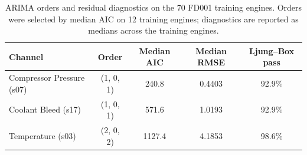 \begin{table}[H]
\centering
\caption{ARIMA orders and residual diagnostics on the 70 FD001 training engines.
Orders were selected by median AIC on 12 training engines; diagnostics are reported as
medians across the training engines.}
\label{tab:arima}
\small
\begin{tabular}{lcccc}
\toprule
Channel & Order & Median AIC & Median RMSE & Ljung--Box pass \\
\midrule
Compressor Pressure (s07) & (1, 0, 1) & 240.8 & 0.4403 & 92.9\% \\
Coolant Bleed (s17) & (1, 0, 1) & 571.6 & 1.0193 & 92.9\% \\
Temperature (s03) & (2, 0, 2) & 1127.4 & 4.1853 & 98.6\% \\
\bottomrule
\end{tabular}
\end{table}
